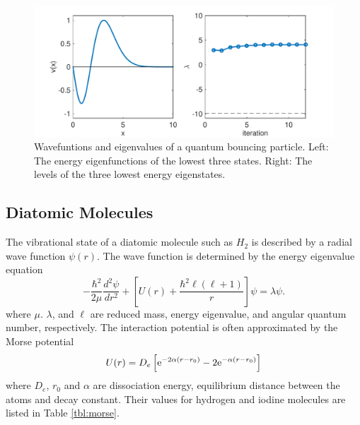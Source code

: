\begin{figure}
\centering
\includegraphics[width=5.5in]{07.ode3/bounce_qm.pdf}
\caption{Wavefuntions and eigenvalues of a quantum bouncing particle. Left: The energy eigenfunctions of the lowest three states.
Right: The levels of the three lowest energy eigenstates.}\label{fig:bounce_qm}
\end{figure}

\subsection{Diatomic Molecules}



The vibrational state of a diatomic molecule such as $H_2$ is described by a radial wave function $\psi(r)$. The wave function is determined by the energy eigenvalue equation
\begin{equation}\label{eq:qm_morse}
-\frac{\hbar^2}{2\mu} \frac{d^2 \psi}{dr^2} + \left[
U(r) + \frac{\hbar^2 \ell (\ell + 1)}{r} \right] \psi = \lambda \psi.
\end{equation}
where $\mu$. $\lambda$, and $\ell$ are reduced mass, energy eigenvalue, and angular quantum number, respectively.  The interaction potential is often approximated by the Morse potential
\begin{equation}
U(r) = D_e \left[
\text{e}^{-2 \alpha (r-r_0)} - 2 \text{e}^{-\alpha (r-r_0)} \right ]
\end{equation}
where $D_e$, $r_0$ and $\alpha$ are dissociation energy, equilibrium distance between the atoms and decay constant.  Their values for hydrogen and iodine molecules are listed in Table \ref{tbl:morse}.




